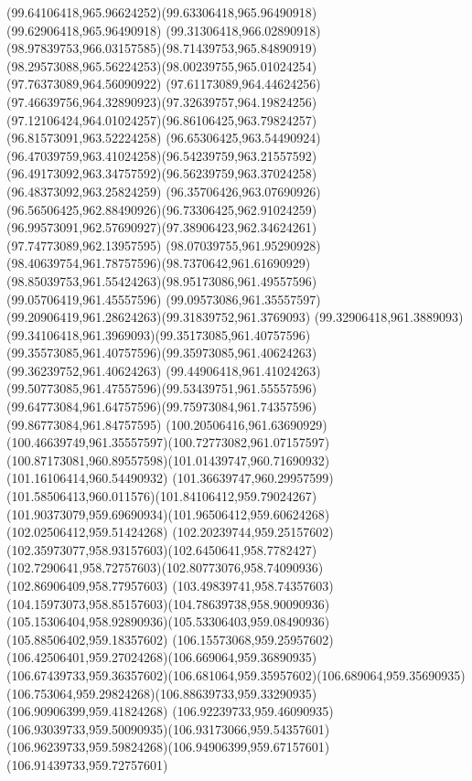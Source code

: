 {{  \curveto(99.64106418,965.96624252)(99.63306418,965.96490918)(99.62906418,965.96490918)
  \curveto(99.31306418,966.02890918)(98.97839753,966.03157585)(98.71439753,965.84890919)
  \curveto(98.29573088,965.56224253)(98.00239755,965.01024254)(97.76373089,964.56090922)
  \curveto(97.61173089,964.44624256)(97.46639756,964.32890923)(97.32639757,964.19824256)
  \curveto(97.12106424,964.01024257)(96.86106425,963.79824257)(96.81573091,963.52224258)
  \curveto(96.65306425,963.54490924)(96.47039759,963.41024258)(96.54239759,963.21557592)
  \curveto(96.49173092,963.34757592)(96.56239759,963.37024258)(96.48373092,963.25824259)
  \curveto(96.35706426,963.07690926)(96.56506425,962.88490926)(96.73306425,962.91024259)
  \curveto(96.99573091,962.57690927)(97.38906423,962.34624261)(97.74773089,962.13957595)
  \curveto(98.07039755,961.95290928)(98.40639754,961.78757596)(98.7370642,961.61690929)
  \curveto(98.85039753,961.55424263)(98.95173086,961.49557596)(99.05706419,961.45557596)
  \curveto(99.09573086,961.35557597)(99.20906419,961.28624263)(99.31839752,961.3769093)
  \curveto(99.32906418,961.3889093)(99.34106418,961.3969093)(99.35173085,961.40757596)
  \curveto(99.35573085,961.40757596)(99.35973085,961.40624263)(99.36239752,961.40624263)
  \curveto(99.44906418,961.41024263)(99.50773085,961.47557596)(99.53439751,961.55557596)
  \curveto(99.64773084,961.64757596)(99.75973084,961.74357596)(99.86773084,961.84757595)
  \curveto(100.20506416,961.63690929)(100.46639749,961.35557597)(100.72773082,961.07157597)
  \curveto(100.87173081,960.89557598)(101.01439747,960.71690932)(101.16106414,960.54490932)
  \curveto(101.36639747,960.29957599)(101.58506413,960.011576)(101.84106412,959.79024267)
  \curveto(101.90373079,959.69690934)(101.96506412,959.60624268)(102.02506412,959.51424268)
  \curveto(102.20239744,959.25157602)(102.35973077,958.93157603)(102.6450641,958.7782427)
  \curveto(102.7290641,958.72757603)(102.80773076,958.74090936)(102.86906409,958.77957603)
  \curveto(103.49839741,958.74357603)(104.15973073,958.85157603)(104.78639738,958.90090936)
  \curveto(105.15306404,958.92890936)(105.53306403,959.08490936)(105.88506402,959.18357602)
  \curveto(106.15573068,959.25957602)(106.42506401,959.27024268)(106.669064,959.36890935)
  \curveto(106.67439733,959.36357602)(106.681064,959.35957602)(106.689064,959.35690935)
  \curveto(106.753064,959.29824268)(106.88639733,959.33290935)(106.90906399,959.41824268)
  \curveto(106.92239733,959.46090935)(106.93039733,959.50090935)(106.93173066,959.54357601)
  \curveto(106.96239733,959.59824268)(106.94906399,959.67157601)(106.91439733,959.72757601)
}}
